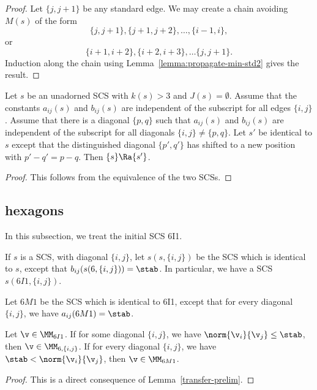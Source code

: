 \begin{proof}  Let $\{j,j+1\}$ be any standard edge.  We may create a chain avoiding $M(s)$ of the form
\[
\{j,j+1\}, \{j+1,j+2\},\ldots, \{i-1,i\},
\]
or 
\[
\{i+1,i+2\}, \{i+2,i+3\},\ldots \{j,j+1\}.
\]
Induction along the chain using Lemma~\ref{lemma:propagate-min-std2} gives the result.
\end{proof}

\begin{lemma}\label{lemma:equivalent-diagonal}
Let $s$ be an unadorned SCS with $k(s)>3$ and $J(s)=\emptyset$.  
Assume that the constants $a_{ij}(s)$ and $b_{ij}(s)$ are independent of
the subscript for all edges $\{i,j\}$.  Assume that there is a diagonal $\{p,q\}$ such that 
$a_{ij}(s)$ and $b_{ij}(s)$ are independent of the subscript for all diagonals $\{i,j\}\ne \{p,q\}$.
Let $s'$ be identical to $s$ except that the distinguished diagonal $\{p',q'\}$ has shifted
to a new position with $p' - q' = p - q$.  Then $\{s\}\Ra \{s'\}$.
\end{lemma}

\begin{proof}  This follows from the equivalence of the two SCSs.
\end{proof}

\subsection{hexagons}

In this subsection, we treat the initial SCS 6I1.

If $s$ is a SCS,
with  diagonal $\{i,j\}$, let $s(s,\{i,j\})$ be the SCS which is identical to $s$, except that
$b_{ij}(s(6,\{i,j\})) =\stab$.   In particular, we have a SCS $s(6I1,\{i,j\})$.

Let $6M1$ be the SCS which is identical to 6I1, except that for every
diagonal $\{i,j\}$, we have $a_{ij}(6M1) = \stab$.  

\begin{lemma} Let $\v\in \MM_{6I1}$.  If for some diagonal $\{i,j\}$, we have $\norm{\v_i}{\v_j}\le \stab$,
then $\v\in \MM_{6,\{i,j\}}$.  If for every diagonal $\{i,j\}$, we have $\stab < \norm{\v_i}{\v_j}$, then
$\v \in \MM_{6M1}$.
\end{lemma}

\begin{proof} This is a direct consequence of Lemma~\ref{transfer-prelim}.
\end{proof}

